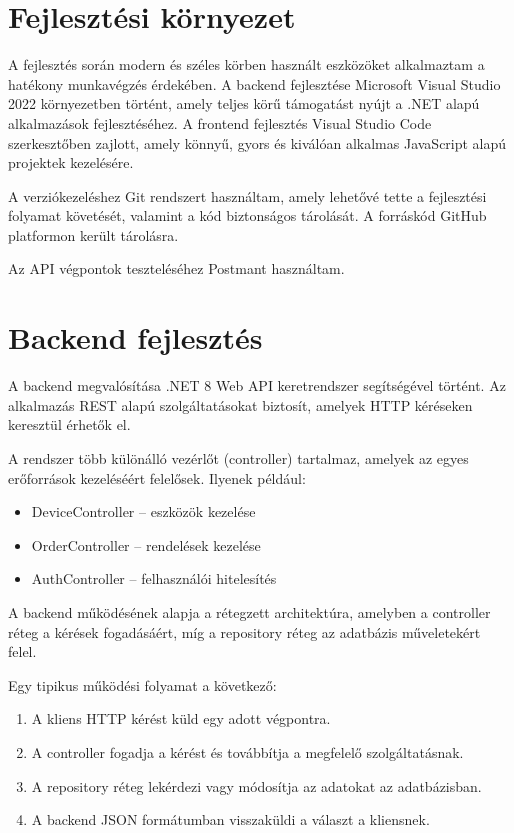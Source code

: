 \documentclass[
]{thesis-ekf}
\theoremstyle{definition}
\theoremstyle{remark}
\begin{document}
\section{Fejlesztési környezet}
A fejlesztés során modern és széles körben használt eszközöket alkalmaztam a hatékony munkavégzés érdekében. A backend fejlesztése Microsoft Visual Studio 2022 környezetben történt, amely teljes körű támogatást nyújt a .NET alapú alkalmazások fejlesztéséhez. A frontend fejlesztés Visual Studio Code szerkesztőben zajlott, amely könnyű, gyors és kiválóan alkalmas JavaScript alapú projektek kezelésére.

A verziókezeléshez Git rendszert használtam, amely lehetővé tette a fejlesztési folyamat követését, valamint a kód biztonságos tárolását. A forráskód GitHub platformon került tárolásra.

Az API végpontok teszteléséhez Postmant használtam.

\section{Backend fejlesztés}
A backend megvalósítása .NET 8 Web API keretrendszer segítségével történt. Az alkalmazás REST alapú szolgáltatásokat biztosít, amelyek HTTP kéréseken keresztül érhetők el.

A rendszer több különálló vezérlőt (controller) tartalmaz, amelyek az egyes erőforrások kezeléséért felelősek. Ilyenek például:

\begin{itemize}
	\item DeviceController – eszközök kezelése
	\item OrderController – rendelések kezelése
	\item AuthController – felhasználói hitelesítés
\end{itemize}

A backend működésének alapja a rétegzett architektúra, amelyben a controller réteg a kérések fogadásáért, míg a repository réteg az adatbázis műveletekért felel.

Egy tipikus működési folyamat a következő:

\begin{enumerate}
	\item A kliens HTTP kérést küld egy adott végpontra.
	\item A controller fogadja a kérést és továbbítja a megfelelő szolgáltatásnak.
	\item A repository réteg lekérdezi vagy módosítja az adatokat az adatbázisban.
	\item A backend JSON formátumban visszaküldi a választ a kliensnek.
\end{enumerate}
\end{document}
